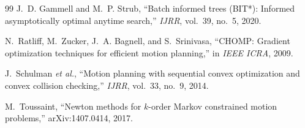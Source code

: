 \documentclass[journal]{IEEEtran}
\begin{document}
\begin{thebibliography}{99}
J.~D. Gammell and M.~P. Strub, ``Batch informed trees (BIT*): Informed asymptotically optimal anytime search,'' \emph{IJRR}, vol.~39, no.~5, 2020.

N.~Ratliff, M.~Zucker, J.~A. Bagnell, and S.~Srinivasa, ``CHOMP: Gradient optimization techniques for efficient motion planning,'' in \emph{IEEE ICRA}, 2009.

J.~Schulman \textit{et al.}, ``Motion planning with sequential convex optimization and convex collision checking,'' \emph{IJRR}, vol.~33, no.~9, 2014.

M.~Toussaint, ``Newton methods for $k$-order Markov constrained motion problems,'' arXiv:1407.0414, 2017.

\end{thebibliography}
\end{document}
